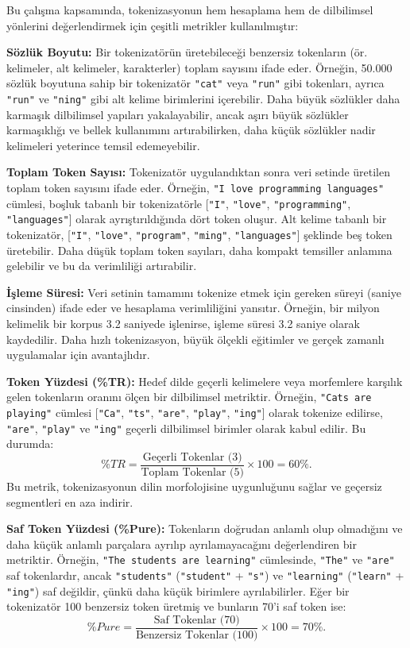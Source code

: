 Bu çalışma kapsamında, tokenizasyonun hem hesaplama hem de dilbilimsel yönlerini değerlendirmek için çeşitli metrikler kullanılmıştır:

\textbf{Sözlük Boyutu:}  
Bir tokenizatörün üretebileceği benzersiz tokenların (ör. kelimeler, alt kelimeler, karakterler) toplam sayısını ifade eder. Örneğin, 50.000 sözlük boyutuna sahip bir tokenizatör \texttt{"cat"} veya \texttt{"run"} gibi tokenları, ayrıca \texttt{"run"} ve \texttt{"ning"} gibi alt kelime birimlerini içerebilir. Daha büyük sözlükler daha karmaşık dilbilimsel yapıları yakalayabilir, ancak aşırı büyük sözlükler karmaşıklığı ve bellek kullanımını artırabilirken, daha küçük sözlükler nadir kelimeleri yeterince temsil edemeyebilir.

\textbf{Toplam Token Sayısı:}  
Tokenizatör uygulandıktan sonra veri setinde üretilen toplam token sayısını ifade eder. Örneğin, \texttt{"I love programming languages"} cümlesi, boşluk tabanlı bir tokenizatörle [\texttt{"I"}, \texttt{"love"}, \texttt{"programming"}, \texttt{"languages"}] olarak ayrıştırıldığında dört token oluşur. Alt kelime tabanlı bir tokenizatör, [\texttt{"I"}, \texttt{"love"}, \texttt{"program"}, \texttt{"ming"}, \texttt{"languages"}] şeklinde beş token üretebilir. Daha düşük toplam token sayıları, daha kompakt temsiller anlamına gelebilir ve bu da verimliliği artırabilir.

\textbf{İşleme Süresi:}  
Veri setinin tamamını tokenize etmek için gereken süreyi (saniye cinsinden) ifade eder ve hesaplama verimliliğini yansıtır. Örneğin, bir milyon kelimelik bir korpus 3.2 saniyede işlenirse, işleme süresi 3.2 saniye olarak kaydedilir. Daha hızlı tokenizasyon, büyük ölçekli eğitimler ve gerçek zamanlı uygulamalar için avantajlıdır.

\textbf{Token Yüzdesi (\%TR):}  
Hedef dilde geçerli kelimelere veya morfemlere karşılık gelen tokenların oranını ölçen bir dilbilimsel metriktir. Örneğin, \texttt{"Cats are playing"} cümlesi [\texttt{"Ca"}, \texttt{"ts"}, \texttt{"are"}, \texttt{"play"}, \texttt{"ing"}] olarak tokenize edilirse, \texttt{"are"}, \texttt{"play"} ve \texttt{"ing"} geçerli dilbilimsel birimler olarak kabul edilir. Bu durumda:  
\[
\%TR = \frac{\text{Geçerli Tokenlar (3)}}{\text{Toplam Tokenlar (5)}} \times 100 = 60\%.
\]
Bu metrik, tokenizasyonun dilin morfolojisine uygunluğunu sağlar ve geçersiz segmentleri en aza indirir.

\textbf{Saf Token Yüzdesi (\%Pure):}  
Tokenların doğrudan anlamlı olup olmadığını ve daha küçük anlamlı parçalara ayrılıp ayrılamayacağını değerlendiren bir metriktir. Örneğin, \texttt{"The students are learning"} cümlesinde, \texttt{"The"} ve \texttt{"are"} saf tokenlardır, ancak \texttt{"students"} (\texttt{"student"} + \texttt{"s"}) ve \texttt{"learning"} (\texttt{"learn"} + \texttt{"ing"}) saf değildir, çünkü daha küçük birimlere ayrılabilirler. Eğer bir tokenizatör 100 benzersiz token üretmiş ve bunların 70’i saf token ise:  
\[
\%Pure = \frac{\text{Saf Tokenlar (70)}}{\text{Benzersiz Tokenlar (100)}} \times 100 = 70\%.
\]

